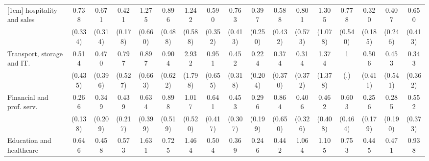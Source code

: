 {\begin{tabular}{l*{16}{c}}
[1em]
hospitality and sales&       0.738         &       0.671         &       0.421\sym{*}  &       1.275         &       0.896         &       1.242         &       0.590         &       0.763         &       0.397         &       0.588         &       0.801         &       1.305         &       0.778         &       0.320\sym{*}  &       0.407         &       0.650         \\
                    &     (0.334)         &     (0.314)         &     (0.178)         &     (0.660)         &     (0.488)         &     (0.588)         &     (0.352)         &     (0.413)         &     (0.250)         &     (0.432)         &     (0.573)         &     (1.078)         &     (0.540)         &     (0.185)         &     (0.246)         &     (0.413)         \\
[1em]
Transport, storage and IT.&       0.514         &       0.470         &       0.797         &       0.897         &       0.904         &       2.932         &       0.951         &       0.452         &       0.224         &       0.374         &       0.314         &       1.374         &           1         &       0.506         &       0.453         &       0.343         \\
                    &     (0.435)         &     (0.396)         &     (0.527)         &     (0.663)         &     (0.622)         &     (1.798)         &     (0.655)         &     (0.318)         &     (0.204)         &     (0.370)         &     (0.372)         &     (1.378)         &         (.)         &     (0.411)         &     (0.541)         &     (0.362)         \\
[1em]
Financial and prof. serv.&       0.266\sym{*}  &       0.349         &       0.439         &       0.634         &       0.898         &       1.017         &       0.641         &       0.453         &       0.296         &       0.864         &       0.406         &       0.462         &       0.603         &       0.256         &       0.285         &       0.552         \\
                    &     (0.138)         &     (0.209)         &     (0.217)         &     (0.399)         &     (0.519)         &     (0.520)         &     (0.417)         &     (0.307)         &     (0.199)         &     (0.650)         &     (0.326)         &     (0.408)         &     (0.464)         &     (0.179)         &     (0.190)         &     (0.373)         \\
[1em]
Education and healthcare&       0.646         &       0.458         &       0.573         &       1.631         &       0.725         &       1.464         &       0.504         &       0.369         &       0.246\sym{*}  &       0.442         &       1.064         &       1.105         &       0.753         &       0.445         &       0.471         &       0.938         \\

\end{tabular}}
